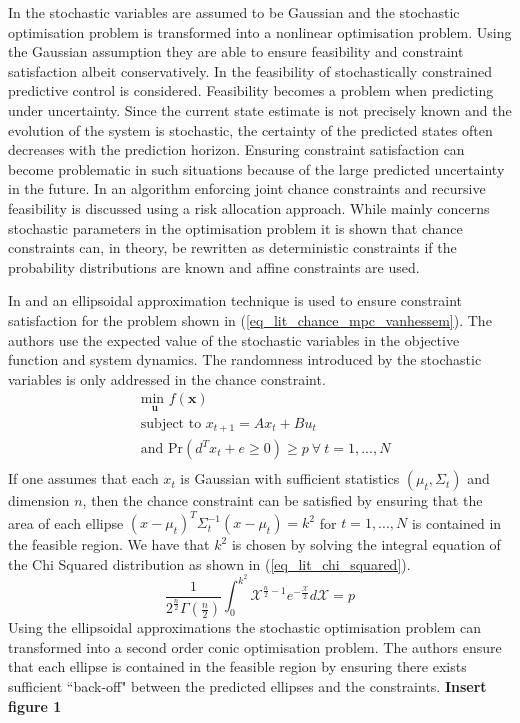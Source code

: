 In \cite{li2} the stochastic variables are assumed to be Gaussian and the stochastic optimisation problem is transformed into a nonlinear optimisation problem. Using the Gaussian assumption they are able to ensure feasibility and constraint satisfaction albeit conservatively. In \cite{masahiro} the feasibility of stochastically constrained predictive control is considered. Feasibility becomes a problem when predicting under uncertainty. Since the current state estimate is not precisely known and the evolution of the system is stochastic, the certainty of the predicted states often decreases with the prediction horizon. Ensuring constraint satisfaction can become problematic in such situations because of the large predicted uncertainty in the future. In \cite{masahiro} an algorithm enforcing joint chance constraints and recursive feasibility is discussed using a risk allocation approach. While \cite{schwarm} mainly concerns stochastic parameters in the optimisation problem it is shown that chance constraints can, in theory, be rewritten as deterministic constraints if the probability distributions are known and affine constraints are used. 

In \cite{vanhessem2} and \cite{vanhessem1} an ellipsoidal approximation technique is used to ensure constraint satisfaction for the problem shown in (\ref{eq_lit_chance_mpc_vanhessem}). The authors use the expected value of the stochastic variables in the objective function and system dynamics. The randomness introduced by the stochastic variables is only addressed in the chance constraint. 
\begin{equation}
\begin{aligned}
&\underset{\mathbf{u}}{\text{min }} f(\mathbf{x}) \\
& \text{subject to } x_{t+1}=Ax_t+Bu_t \\
& \text{and } \text{Pr}(d^Tx_t + e \geq 0) \geq p ~\forall ~t=1,...,N\\
\end{aligned}
\label{eq_lit_chance_mpc_vanhessem}
\end{equation}
If one assumes that each $x_t$ is Gaussian with sufficient statistics $(\mu_t, \Sigma_t)$ and dimension $n$, then the chance constraint can be satisfied by ensuring that the area of each ellipse $(x-\mu_t)^T\Sigma_t^{-1}(x-\mu_t)=k^2$ for $t=1,...,N$ is contained in the feasible region. We have that $k^2$ is chosen by solving the integral equation of the Chi Squared distribution as shown in (\ref{eq_lit_chi_squared}).
\begin{equation}
\frac{1}{2^{\frac{n}{2}}\Gamma(\frac{n}{2})}\int_0^{k^2}\mathcal{X}^{\frac{n}{2}-1}e^{-\frac{\mathcal{X}}{2}}d\mathcal{X} = p
\label{eq_lit_chi_squared}
\end{equation} 
Using the ellipsoidal approximations the stochastic optimisation problem can transformed into a second order conic optimisation problem. The authors ensure that each ellipse is contained in the feasible region by ensuring there exists sufficient ``back-off" between the predicted ellipses and the constraints. \textbf{Insert figure 1}

